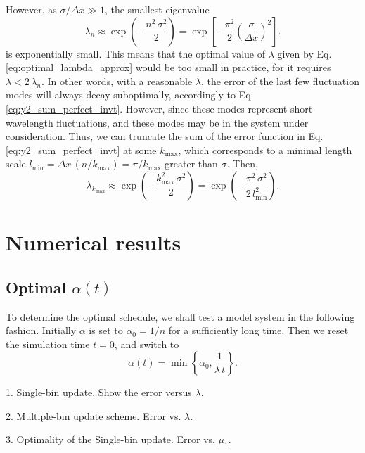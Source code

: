 \documentclass[reprint]{revtex4-1}
\begin{document}
However,
as $\sigma/\Delta x \gg 1$,
the smallest eigenvalue
%
$$
\lambda_n
\approx
\exp\left(
      -\frac{ n^2 \, \sigma^2 }
            {        2        }
    \right)
=
\exp\left[
      -\frac{ \pi^2 }{ 2 }
      \left(
        \frac{  \sigma }
             { \Delta x }
      \right)^2
    \right]
.
$$
%
is exponentially small.
%
This means that
the optimal value of $\lambda$
given by Eq. \eqref{eq:optimal_lambda_approx}
would be too small in practice,
for it requires $\lambda < 2 \, \lambda_n$.
%
In other words,
with a reasonable $\lambda$,
the error of the last few fluctuation modes
will always decay suboptimally,
accordingly to Eq. \eqref{eq:y2_sum_perfect_invt}.
%
However, since these modes
represent short wavelength fluctuations,
and these modes may be in
the system under consideration.
%
Thus,
we can truncate the sum of the error function
in Eq. \eqref{eq:y2_sum_perfect_invt}
at some $k_{\max}$,
which corresponds to a minimal length scale
$l_{\min} = \Delta x \, (n /k_{\max}) = \pi/k_{\max}$
greater than $\sigma$.
%
Then,
$$
\lambda_{ k_{\max} }
\approx
\exp\left(
      -\frac{ k_{\max}^2 \, \sigma^2 }
            {           2            }
    \right)
=
\exp\left(
      -\frac{  \pi^2 \, \sigma^2    }
            {    2 \, l_{\min}^2  }
    \right).
$$




\section{Numerical results}


\subsection{Optimal $\alpha(t)$}


To determine the optimal schedule,
we shall test a model system
in the following fashion.
%
Initially $\alpha$ is set to $\alpha_0 = 1/n$
for a sufficiently long time.
%
Then we reset the simulation time $t = 0$,
and switch to
$$
\alpha(t) = \min\left\{ \alpha_0, \frac{ 1 } { \lambda \, t } \right\}.
$$


1. Single-bin update.
Show the error versus $\lambda$.


2. Multiple-bin update scheme.
Error vs. $\lambda$.

3. Optimality of the Single-bin update.
Error vs. $\mu_1$.
\end{document}
